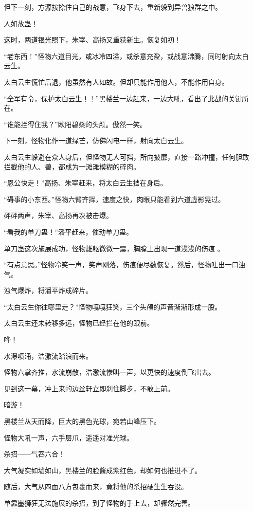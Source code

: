 \begin{this_body}
但下一刻，方源按捺住自己的战意，飞身下去，重新躲到异兽狼群之中。

人如故蛊！

这时，两道银光照下，朱宰、高扬又重获新生。恢复如初！

“老东西！”怪物六道目光，或冰冷四溢，或杀意充盈，或战意沸腾，同时射向太白云生。

太白云生慌忙后退，他虽然有人如故。但却只能作用他人，不能作用自身。

“全军有令，保护太白云生！！”黑楼兰一边赶来，一边大吼，看出了此战的关键所在。

“谁能拦得住我？”欧阳碧桑的头颅。傲然一笑。

下一刻，怪物化作一道绿芒，仿佛闪电一样，射向太白云生。

太白云生躲避在众人身后，但怪物无人可挡，所向披靡，直接一路冲撞，任何胆敢拦截他的人、兽，都成为一滩滩模糊的碎肉。

“恩公快走！”高扬、朱宰赶来，将太白云生挡在身后。

“碍事的小东西。”怪物六臂齐挥，速度之快，肉眼只能看到六道虚影晃过。

砰砰两声，朱宰、高扬再次被击爆。

“看我的单刀蛊！”潘平赶来，催动单刀蛊。

单刀蛊这次施展成功，怪物雄躯微微一震，胸膛上出现一道浅浅的伤痕 。

“有点意思。”怪物冷笑一声，笑声刚落，伤痕便尽数恢复。然后，怪物吐出一口浊气。

浊气爆炸，将潘平炸成碎片。

“太白云生你往哪里走？”怪物嘎嘎狂笑，三个头颅的声音渐渐形成一股。

太白云生还未转移多远，怪物已经拦在他的跟前。

哗！

水瀑喷涌，浩激流踏浪而来。

怪物六掌齐推，水流崩散，浩激流惨叫一声，以更快的速度倒飞出去。

见到这一幕，冲上来的边丝轩立即刹住脚步，不敢上前。

暗漩！

黑楼兰从天而降，巨大的黑色光球，宛若山峰压下。

怪物大吼一声，六手层爪，遥遥对准光球。

杀招――气吞六合！

大气凝实如墙如山，黑楼兰的脸酱成紫红色，却如何也推进不了。

随后，大气从四面八方包裹而来，竟将他的杀招硬生生吞没。

单靠墨狮狂无法施展的杀招，到了怪物的手上去，却骤然完善。


\end{this_body}
